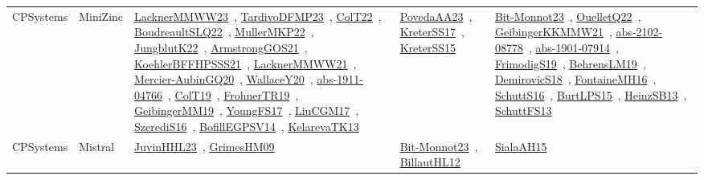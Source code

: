 {\begin{longtable}{lp{3cm}>{\raggedright\arraybackslash}p{6cm}>{\raggedright\arraybackslash}p{6cm}>{\raggedright\arraybackslash}p{8cm}}
CPSystems & MiniZinc & \href{works/LacknerMMWW23.pdf}{LacknerMMWW23}~\cite{LacknerMMWW23}, \href{works/TardivoDFMP23.pdf}{TardivoDFMP23}~\cite{TardivoDFMP23}, \href{works/ColT22.pdf}{ColT22}~\cite{ColT22}, \href{works/BoudreaultSLQ22.pdf}{BoudreaultSLQ22}~\cite{BoudreaultSLQ22}, \href{works/MullerMKP22.pdf}{MullerMKP22}~\cite{MullerMKP22}, \href{works/JungblutK22.pdf}{JungblutK22}~\cite{JungblutK22}, \href{works/ArmstrongGOS21.pdf}{ArmstrongGOS21}~\cite{ArmstrongGOS21}, \href{works/KoehlerBFFHPSSS21.pdf}{KoehlerBFFHPSSS21}~\cite{KoehlerBFFHPSSS21}, \href{works/LacknerMMWW21.pdf}{LacknerMMWW21}~\cite{LacknerMMWW21}, \href{works/Mercier-AubinGQ20.pdf}{Mercier-AubinGQ20}~\cite{Mercier-AubinGQ20}, \href{works/WallaceY20.pdf}{WallaceY20}~\cite{WallaceY20}, \href{works/abs-1911-04766.pdf}{abs-1911-04766}~\cite{abs-1911-04766}, \href{works/ColT19.pdf}{ColT19}~\cite{ColT19}, \href{works/FrohnerTR19.pdf}{FrohnerTR19}~\cite{FrohnerTR19}, \href{works/GeibingerMM19.pdf}{GeibingerMM19}~\cite{GeibingerMM19}, \href{works/YoungFS17.pdf}{YoungFS17}~\cite{YoungFS17}, \href{works/LiuCGM17.pdf}{LiuCGM17}~\cite{LiuCGM17}, \href{works/SzerediS16.pdf}{SzerediS16}~\cite{SzerediS16}, \href{works/BofillEGPSV14.pdf}{BofillEGPSV14}~\cite{BofillEGPSV14}, \href{works/KelarevaTK13.pdf}{KelarevaTK13}~\cite{KelarevaTK13} & \href{works/PovedaAA23.pdf}{PovedaAA23}~\cite{PovedaAA23}, \href{works/KreterSS17.pdf}{KreterSS17}~\cite{KreterSS17}, \href{works/KreterSS15.pdf}{KreterSS15}~\cite{KreterSS15} & \href{works/Bit-Monnot23.pdf}{Bit-Monnot23}~\cite{Bit-Monnot23}, \href{works/OuelletQ22.pdf}{OuelletQ22}~\cite{OuelletQ22}, \href{works/GeibingerKKMMW21.pdf}{GeibingerKKMMW21}~\cite{GeibingerKKMMW21}, \href{works/abs-2102-08778.pdf}{abs-2102-08778}~\cite{abs-2102-08778}, \href{works/abs-1901-07914.pdf}{abs-1901-07914}~\cite{abs-1901-07914}, \href{works/FrimodigS19.pdf}{FrimodigS19}~\cite{FrimodigS19}, \href{works/BehrensLM19.pdf}{BehrensLM19}~\cite{BehrensLM19}, \href{works/DemirovicS18.pdf}{DemirovicS18}~\cite{DemirovicS18}, \href{works/FontaineMH16.pdf}{FontaineMH16}~\cite{FontaineMH16}, \href{works/SchuttS16.pdf}{SchuttS16}~\cite{SchuttS16}, \href{works/BurtLPS15.pdf}{BurtLPS15}~\cite{BurtLPS15}, \href{works/HeinzSB13.pdf}{HeinzSB13}~\cite{HeinzSB13}, \href{works/SchuttFS13.pdf}{SchuttFS13}~\cite{SchuttFS13}\\
CPSystems & Mistral & \href{works/JuvinHHL23.pdf}{JuvinHHL23}~\cite{JuvinHHL23}, \href{works/GrimesHM09.pdf}{GrimesHM09}~\cite{GrimesHM09} & \href{works/Bit-Monnot23.pdf}{Bit-Monnot23}~\cite{Bit-Monnot23}, \href{works/BillautHL12.pdf}{BillautHL12}~\cite{BillautHL12} & \href{works/SialaAH15.pdf}{SialaAH15}~\cite{SialaAH15}\\

\end{longtable}}
